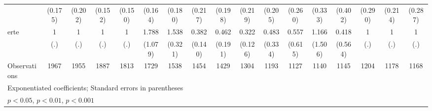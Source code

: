 {\begin{tabular}{l*{16}{c}}
                    &     (0.175)         &     (0.202)         &     (0.152)         &     (0.150)         &     (0.164)         &     (0.180)         &     (0.217)         &     (0.198)         &     (0.219)         &     (0.205)         &     (0.260)         &     (0.333)         &     (0.402)         &     (0.290)         &     (0.214)         &     (0.287)         \\
[1em]
erte                &           1         &           1         &           1         &           1         &       1.788         &       1.538\sym{*}  &       0.382\sym{**} &       0.462         &       0.322\sym{**} &       0.483         &       0.557         &       1.166         &       0.418         &           1         &           1         &           1         \\
                    &         (.)         &         (.)         &         (.)         &         (.)         &     (1.079)         &     (0.321)         &     (0.140)         &     (0.191)         &     (0.126)         &     (0.334)         &     (0.615)         &     (1.506)         &     (0.564)         &         (.)         &         (.)         &         (.)         \\
\hline
Observations        &        1967         &        1955         &        1887         &        1813         &        1729         &        1538         &        1454         &        1429         &        1304         &        1193         &        1127         &        1140         &        1145         &        1204         &        1178         &        1168         \\
\hline\hline
\multicolumn{17}{l}{\footnotesize Exponentiated coefficients; Standard errors in parentheses}\\
\multicolumn{17}{l}{\footnotesize \sym{*} \(p<0.05\), \sym{**} \(p<0.01\), \sym{***} \(p<0.001\)}\\
\end{tabular}
}
